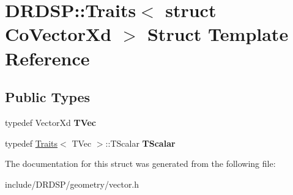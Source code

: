 \hypertarget{struct_d_r_d_s_p_1_1_traits_3_01struct_01_co_vector_xd_01_4}{\section{D\-R\-D\-S\-P\-:\-:Traits$<$ struct Co\-Vector\-Xd $>$ Struct Template Reference}
\label{struct_d_r_d_s_p_1_1_traits_3_01struct_01_co_vector_xd_01_4}
}
\subsection*{Public Types}
\begin{DoxyCompactItemize}
\item 
\hypertarget{struct_d_r_d_s_p_1_1_traits_3_01struct_01_co_vector_xd_01_4_aebf9a61ca9132aadba80b889a3e3e8c3}{typedef Vector\-Xd {\bfseries T\-Vec}}\label{struct_d_r_d_s_p_1_1_traits_3_01struct_01_co_vector_xd_01_4_aebf9a61ca9132aadba80b889a3e3e8c3}

\item 
\hypertarget{struct_d_r_d_s_p_1_1_traits_3_01struct_01_co_vector_xd_01_4_a399aec522527420dc77ba3fd95bdbf76}{typedef \hyperlink{struct_d_r_d_s_p_1_1_traits}{Traits}$<$ T\-Vec $>$\-::T\-Scalar {\bfseries T\-Scalar}}\label{struct_d_r_d_s_p_1_1_traits_3_01struct_01_co_vector_xd_01_4_a399aec522527420dc77ba3fd95bdbf76}

\end{DoxyCompactItemize}


The documentation for this struct was generated from the following file\-:\begin{DoxyCompactItemize}
\item 
include/\-D\-R\-D\-S\-P/geometry/vector.\-h\end{DoxyCompactItemize}
